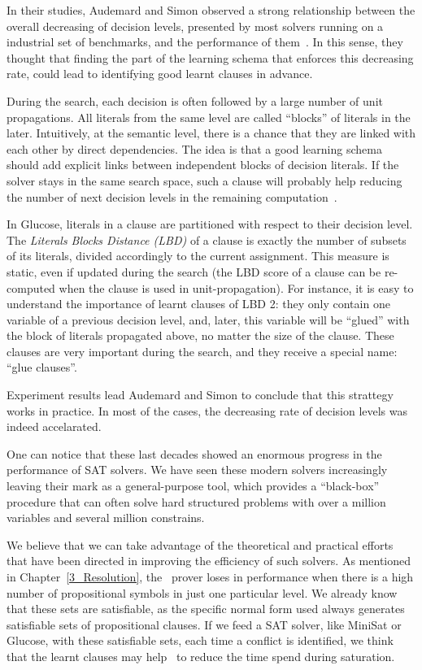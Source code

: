 In their studies, Audemard and Simon observed a strong relationship between the
overall decreasing of decision levels, presented by most solvers running on a
industrial set of benchmarks, and the performance of
them~\cite{audemard2009predicting}.  In this sense, they thought that finding
the part of the learning schema that enforces this decreasing rate, could lead
to identifying good learnt clauses in advance.

During the search, each decision is often followed by a large number of unit
propagations. All literals from the same level are called ``blocks'' of literals
in the later. Intuitively, at the semantic level, there is a chance that they
are linked with each other by direct dependencies. The idea is that a good
learning schema should add explicit links between independent blocks of decision
literals. If the solver stays in the same search space, such a clause will
probably help reducing the number of next decision levels in the remaining
computation~\cite{audemard2009predicting}.

In Glucose, literals in a clause are partitioned with respect to their decision
level. The \emph{Literals Blocks Distance (LBD)} of a clause is exactly the
number of subsets of its literals, divided accordingly to the current
assignment. This measure is static, even if updated during the search (the LBD
score of a clause can be re-computed when the clause is used in
unit-propagation). For instance, it is easy to understand the importance of
learnt clauses of LBD 2: they only contain one variable of a previous decision
level, and, later, this variable will be ``glued'' with the block of literals
propagated above, no matter the size of the clause. These clauses are very
important during the search, and they receive a special name: ``glue clauses''.

Experiment results lead Audemard and Simon to conclude that this strattegy
works in practice. In most of the cases, the decreasing rate of decision
levels was indeed accelarated.

One can notice that these last decades showed an enormous progress in the
performance of SAT solvers. We have seen these modern solvers increasingly
leaving their mark as a general-purpose tool, which provides a ``black-box''
procedure that can often solve hard structured problems with over a million
variables and several million constrains. 

We believe that we can take advantage of the theoretical and practical efforts
that have been directed in improving the efficiency of such solvers. As
mentioned in Chapter~\ref{3_Resolution}, the \ksp\ prover loses in performance
when there is a high number of propositional symbols in just one particular
level. We already know that these sets are satisfiable, as the specific normal
form used always generates satisfiable sets of propositional clauses. If we
feed a SAT solver, like MiniSat or Glucose, with these satisfiable sets, each
time a conflict is identified, we think that the learnt clauses may help \ksp\
to reduce the time spend during saturation.
